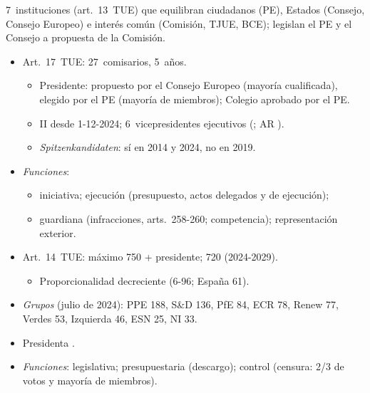 \documentclass{article}
\begin{document}
\begin{columnas}
\begin{ideaclave}
7~instituciones (art.~13~TUE) que equilibran ciudadanos (PE), Estados (Consejo, Consejo Europeo) e interés común (Comisión, TJUE, BCE); legislan el PE y el Consejo a propuesta de la Comisión.
\end{ideaclave}

\begin{itemize}
\item Art.~17~TUE: 27~comisarios, 5~años.
  \begin{itemize}
  \item Presidente: propuesto por el Consejo Europeo (mayoría cualificada), elegido por el PE (mayoría de miembros); Colegio aprobado por el PE.
  \item {} II desde 1-12-2024; 6~vicepresidentes ejecutivos (; AR ).
  \item \emph{Spitzenkandidaten}: sí en 2014 y 2024, no en 2019.
  \end{itemize}
\item \emph{Funciones}:
  \begin{itemize}
  \item iniciativa; ejecución (presupuesto, actos delegados y de ejecución);
  \item guardiana (infracciones, arts.~258-260; competencia); representación exterior.
  \end{itemize}
\end{itemize}

\begin{itemize}
\item Art.~14~TUE: máximo 750 + presidente; 720 (2024-2029).
  \begin{itemize}
  \item Proporcionalidad decreciente (6-96; España 61).
  \end{itemize}
\end{itemize}
\begin{itemize}
\item \emph{Grupos} (julio de 2024): PPE 188, S\&D 136, PfE 84, ECR 78, Renew 77, Verdes 53, Izquierda 46, ESN 25, NI 33.
\item Presidenta .
\item \emph{Funciones}: legislativa; presupuestaria (descargo); control (censura: 2/3 de votos y mayoría de miembros).
\end{itemize}


\end{columnas}
\end{document}
